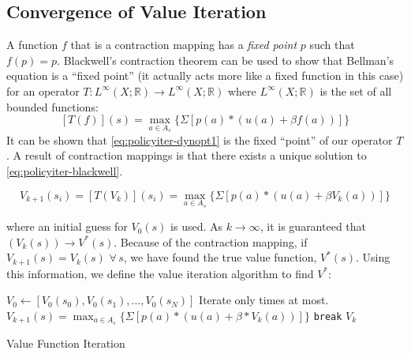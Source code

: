 \subsection*{Convergence of Value Iteration}

A function $f$ that is a contraction mapping has a \emph{fixed point} $p$ such that $f(p) = p$.
Blackwell's contraction theorem can be used to show that Bellman's equation is a ``fixed point'' (it actually acts more like a fixed function in this case)
for an operator $T: L^{\infty}(X;\mathbb{R}) \to L^{\infty}(X;\mathbb{R})$ where $L^{\infty}(X;\mathbb{R})$ is the set of all bounded functions:
\begin{equation}
\label{eq:policyiter-blackwell}
[T(f)](s) = \max_{a \in A_s} \{\Sigma [p(a) * \left( u(a) + \beta f(a)\right)]\}
\end{equation}
It can be shown that \ref{eq:policyiter-dynopt1} is the fixed ``point'' of our operator $T$.
A result of contraction mappings is that there exists a unique solution to \ref{eq:policyiter-blackwell}.


\begin{equation}
\label{eq:policyiter-val-iteration}
V_{k+1}(s_i) = [T(V_k)](s_i) = \max_{a \in A_s} \{\Sigma[p(a) *\left( u(a) + \beta V_k(a)\right)]\}
\end{equation}

where an initial guess for $V_0(s)$ is used.
As $k \to \infty$, it is guaranteed that $(V_k(s)) \to V^*(s)$.
Because of the contraction mapping, if $V_{k+1}(s) = V_k(s) \, \, \forall \, s$, we have found the true value function, $V^*(s)$.
Using this information, we define the value iteration algorithm to find $V^*$:

\begin{algorithm}[H]
\begin{algorithmic}[1]
    \State $V_0 \gets [V_0(s_0),V_0(s_1),\ldots,V_0(s_N)] $
        \Comment Iterate only  times at most.
             \State $V_{k+1}(s) = \max_{a \in A_s}\{\Sigma[p(a)*(u(a) + \beta*V_k(a))]\}$
        \EndFor
            \State \texttt{break}
        \EndIf
    \EndFor
    \State {} $V_k$
\EndProcedure
\end{algorithmic}
\caption{Value Function Iteration}
\label{alg:ValueIteration}
\end{algorithm}

